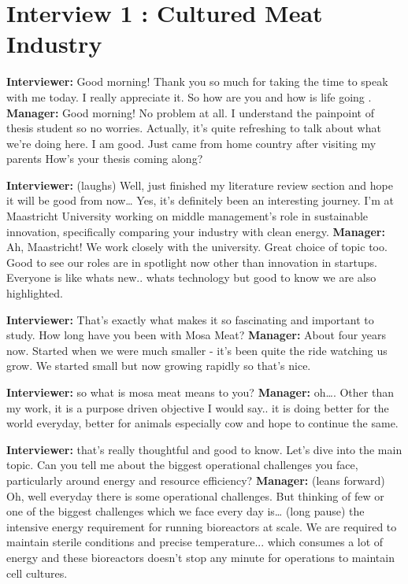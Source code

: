 \section{Interview 1 : Cultured Meat Industry}

\textbf{Interviewer:} Good morning! Thank you so much for taking the time to speak with me today. I really appreciate it. So how are you and how is life going .\newline
\textbf{Manager:} Good morning! No problem at all. I understand the painpoint of thesis student so no worries.  Actually, it's quite refreshing to talk about what we're doing here. I am good. Just came from home country after visiting my parents How's your thesis coming along? \newline

\textbf{Interviewer:} (laughs) Well, just finished my literature review section and hope it will be good from now… Yes, it's definitely been an interesting journey. I'm at Maastricht University working on middle management's role in sustainable innovation, specifically comparing your industry with clean energy. \newline
\textbf{Manager:}  Ah, Maastricht! We work closely with the university. Great choice of topic too. Good to see our roles are in spotlight now other than innovation in startups. Everyone is like whats new.. whats technology but good to know we are also highlighted. \newline

\textbf{Interviewer:} That's exactly what makes it so fascinating and important to study. How long have you been with Mosa Meat? \newline
\textbf{Manager:} About four years now. Started when we were much smaller - it's been quite the ride watching us grow. We started small but now growing rapidly so that's nice. \newline

\textbf{Interviewer:} so what is mosa meat means to you?\newline
\textbf{Manager:} oh…. Other than my work, it is a purpose driven objective I would say.. it is doing better for the world everyday, better for animals especially cow and hope to continue the same.\newline

\textbf{Interviewer:} that's really thoughtful and good to know. Let's dive into the main topic. Can you tell me about the biggest operational challenges you face, particularly around energy and resource efficiency?\newline
\textbf{Manager:} (leans forward) Oh, well everyday there is some operational challenges. But thinking of few or one of the biggest challenges which we face every day is… (long pause) the intensive energy requirement for running bioreactors at scale. We are required to maintain sterile conditions and precise temperature... which consumes a lot of energy and these bioreactors doesn't stop any minute for operations to maintain cell cultures.\newline

